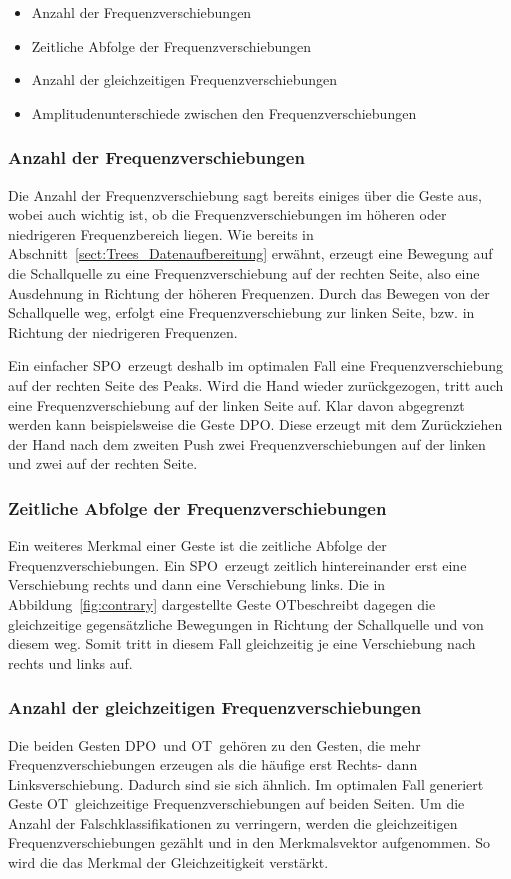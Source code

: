 \begin{itemize} 
\item Anzahl der Frequenzverschiebungen
\item Zeitliche Abfolge der Frequenzverschiebungen
\item Anzahl der gleichzeitigen Frequenzverschiebungen
\item Amplitudenunterschiede zwischen den Frequenzverschiebungen
\end{itemize}

\subsubsection*{Anzahl der Frequenzverschiebungen}
Die Anzahl der Frequenzverschiebung sagt bereits einiges über die Geste aus, wobei auch wichtig ist, ob die Frequenzverschiebungen im höheren oder niedrigeren Frequenzbereich liegen. Wie bereits in Abschnitt~\ref{sect:Trees_Datenaufbereitung} erwähnt, erzeugt eine Bewegung auf die Schallquelle zu eine Frequenzverschiebung auf der rechten Seite, also eine Ausdehnung in Richtung der höheren Frequenzen. Durch das Bewegen von der Schallquelle weg, erfolgt eine Frequenzverschiebung zur linken Seite, bzw. in Richtung der niedrigeren Frequenzen. 

Ein einfacher \glqq \acl{SPO}\grqq\ erzeugt deshalb im optimalen Fall eine Frequenzverschiebung auf der rechten Seite des Peaks. Wird die Hand wieder zurückgezogen, tritt auch eine Frequenzverschiebung auf der linken Seite auf. Klar davon abgegrenzt werden kann beispielsweise die Geste \glqq \acl{DPO}\grqq. Diese erzeugt mit dem Zurückziehen der Hand nach dem zweiten Push zwei Frequenzverschiebungen auf der linken und zwei auf der rechten Seite.

\subsubsection*{Zeitliche Abfolge der Frequenzverschiebungen}
Ein weiteres Merkmal einer Geste ist die zeitliche Abfolge der Frequenzverschiebungen. Ein \glqq \acl{SPO}\grqq\ erzeugt zeitlich hintereinander erst eine Verschiebung rechts und dann eine Verschiebung links. Die in Abbildung~\ref{fig:contrary} dargestellte Geste \glqq \acl{OT}\grqq beschreibt dagegen die gleichzeitige gegensätzliche Bewegungen in Richtung der Schallquelle und von diesem weg. Somit tritt in diesem Fall gleichzeitig je eine Verschiebung nach rechts und links auf. 

\subsubsection*{Anzahl der gleichzeitigen Frequenzverschiebungen}
Die beiden Gesten \glqq \acl{DPO}\grqq\ und \glqq \acl{OT}\grqq\ gehören zu den Gesten, die mehr Frequenzverschiebungen erzeugen als die häufige erst Rechts- dann Linksverschiebung. Dadurch sind sie sich ähnlich. Im optimalen Fall generiert Geste \glqq \acl{OT}\grqq\ gleichzeitige Frequenzverschiebungen auf beiden Seiten. Um die Anzahl der Falschklassifikationen zu verringern, werden die gleichzeitigen Frequenzverschiebungen gezählt und in den Merkmalsvektor aufgenommen. So wird die das Merkmal der Gleichzeitigkeit verstärkt.

